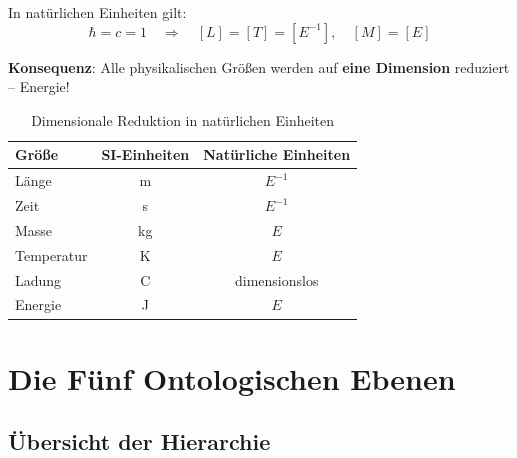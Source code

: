 In natürlichen Einheiten gilt:
\begin{equation}
\hbar = c = 1 \quad \Rightarrow \quad [L] = [T] = [E^{-1}], \quad [M] = [E]
\end{equation}

\textbf{Konsequenz}: Alle physikalischen Größen werden auf \textbf{eine Dimension} reduziert -- Energie!

\begin{table}[h]
\centering
\begin{tabular}{lcc}
\toprule
\textbf{Größe} & \textbf{SI-Einheiten} & \textbf{Natürliche Einheiten} \\
\midrule
Länge & m & $E^{-1}$ \\
Zeit & s & $E^{-1}$ \\
Masse & kg & $E$ \\
Temperatur & K & $E$ \\
Ladung & C & dimensionslos \\
Energie & J & $E$ \\
\bottomrule
\end{tabular}
\caption{Dimensionale Reduktion in natürlichen Einheiten}
\end{table}

\section{Die Fünf Ontologischen Ebenen}

\subsection{Übersicht der Hierarchie}

